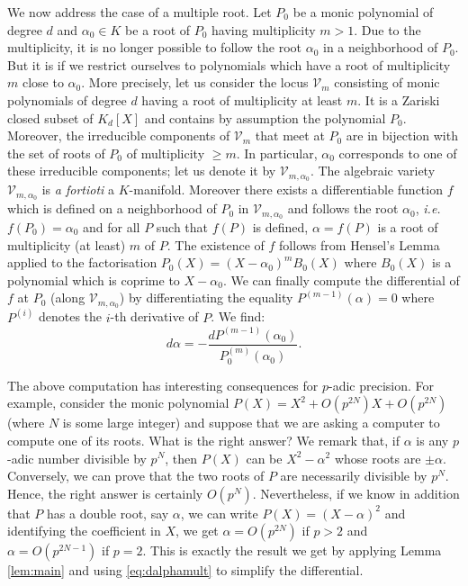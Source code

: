 \documentclass{lms}
\begin{document}
We now address the case of a multiple root. Let $P_0$ be a monic 
polynomial of degree $d$ and $\alpha_0 \in K$ be a root of $P_0$ having 
multiplicity $m > 1$. Due to the multiplicity, it is no longer possible 
to follow the root $\alpha_0$ in a neighborhood of $P_0$. But it is if we 
restrict ourselves to polynomials which have a root of multiplicity $m$ 
close to $\alpha_0$. More precisely, let us consider the locus $\mathcal 
V_m$ consisting of monic polynomials of degree $d$ having a root of 
multiplicity at least $m$. It is a Zariski closed subset of $K_d[X]$ and
contains by assumption the polynomial $P_0$. 
Moreover, the irreducible components of $\mathcal V_m$ that meet at 
$P_0$ are in bijection with the set of roots of $P_0$ of multiplicity 
$\geq m$. In particular, $\alpha_0$ corresponds to one of these 
irreducible components; let us denote it by $\mathcal V_{m,\alpha_0}$. 
The algebraic variety $\mathcal V_{m,\alpha_0}$ is \emph{a fortioti} a
$K$-manifold. Moreover there exists a differentiable function $f$ which 
is defined on a neighborhood of $P_0$ in $\mathcal V_{m,\alpha_0}$ and 
follows the root $\alpha_0$, \emph{i.e.} $f(P_0) = \alpha_0$ and for all 
$P$ such that $f(P)$ is defined, $\alpha = f(P)$ is a root of 
multiplicity (at least) $m$ of $P$. The existence of $f$ follows from 
Hensel's Lemma applied to the factorisation $P_0(X) = (X-\alpha_0)^m 
B_0(X)$ where $B_0(X)$ is a polynomial which is coprime to $X - 
\alpha_0$. We can finally compute the differential of $f$ at $P_0$ 
(along $\mathcal V_{m,\alpha_0}$) by differentiating the equality
$P^{(m-1)}(\alpha) = 0$ where $P^{(i)}$ denotes the $i$-th derivative
of $P$. We find:
\begin{equation}
\label{eq:dalphamult}
d \alpha = - \frac{dP^{(m-1)}(\alpha_0)}{P_0^{(m)}(\alpha_0)}.
\end{equation}

The above computation has interesting consequences for $p$-adic 
precision. For example, consider the monic 
polynomial $P(X) = X^2 + O(p^{2N}) X + O(p^{2N})$ (where $N$ is some 
large integer) and suppose that we are asking a computer to compute one 
of its roots. What is the right answer? We remark that, if $\alpha$ is 
any $p$-adic number divisible by $p^N$, then $P(X)$ can be $X^2 - 
\alpha^2$ whose roots are $\pm \alpha$. Conversely, we can prove that 
the two roots of $P$ are necessarily divisible by $p^N$. Hence, the
right answer is certainly $O(p^N)$. Nevertheless, if we know in addition 
that $P$ has a double root, say $\alpha$, we can write $P(X) = (X - 
\alpha)^2$ and identifying the coefficient in $X$, we get $\alpha =
O(p^{2N})$ if $p > 2$ and $\alpha = O(p^{2N-1})$ if $p=2$.
This is exactly the result we get by applying Lemma \ref{lem:main} and
using \eqref{eq:dalphamult} to simplify the differential.
\end{document}
